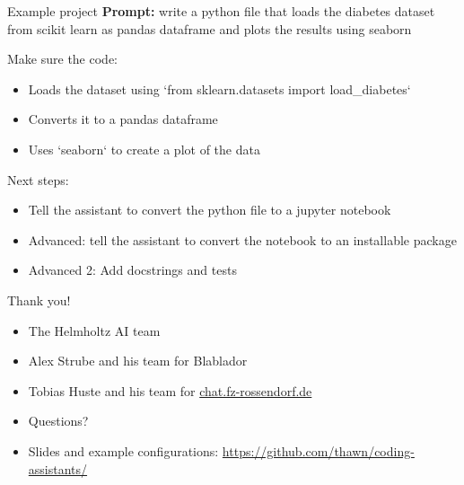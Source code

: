 \documentclass[
  aspectratio=1610,
]{beamer}
\begin{document}
\begin{frame}{Example project}
  \textbf{Prompt:} write a python file that loads the diabetes dataset from scikit learn as pandas dataframe and plots the results using seaborn

  Make sure the code:
  \begin{itemize}
    \item Loads the dataset using `from sklearn.datasets import load\_diabetes`
    \item Converts it to a pandas dataframe
    \item Uses `seaborn` to create a plot of the data
  \end{itemize}
  Next steps:
  \begin{itemize}
    \item Tell the assistant to convert the python file to a jupyter notebook
    \item Advanced: tell the assistant to convert the notebook to an installable package
    \item Advanced 2: Add docstrings and tests
  \end{itemize}
\end{frame}


\begin{frame}{Thank you!}
  \begin{itemize}
    \item The Helmholtz AI team
    \item Alex Strube and his team for Blablador
    \item Tobias Huste and his team for \href{https://chat.fz-rossendorf.de}{chat.fz-rossendorf.de}
    \item Questions?
    \item Slides and example configurations: \href{https://github.com/thawn/coding-assistants/}{https://github.com/thawn/coding-assistants/}
  \end{itemize}

\end{frame}
\end{document}
